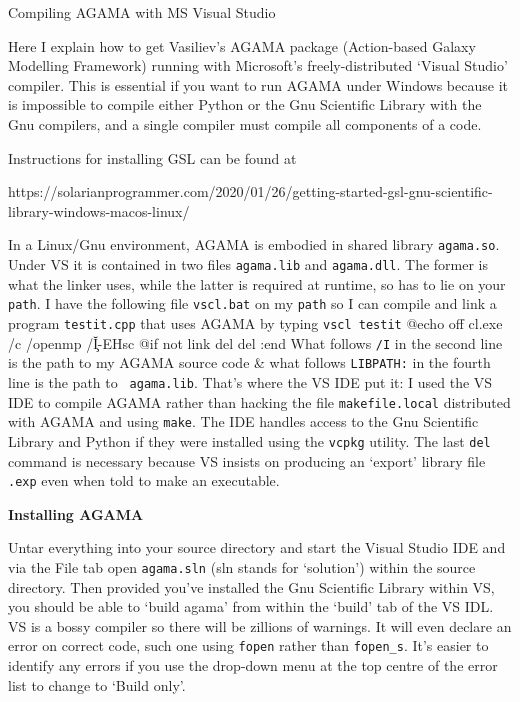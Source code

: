  \reportformat
\centerline{\titlefont Compiling AGAMA with MS Visual Studio}

\bigskip\noindent
Here I explain how to get Vasiliev's  AGAMA package (Action-based  Galaxy
Modelling Framework) running with Microsoft's freely-distributed `Visual Studio'
compiler. This is essential if you want to run AGAMA under
Windows because it is impossible to compile either Python or the Gnu
Scientific Library with the Gnu compilers, and a single compiler must compile all
components of a code.

Instructions for installing GSL can be found at

\noindent https://solarianprogrammer.com/2020/01/26/getting-started-gsl-gnu-scientific-library-windows-macos-linux/

In a Linux/Gnu environment, AGAMA is embodied in shared library {\tt agama.so}. Under
VS it is contained in two files {\tt agama.lib} and {\tt agama.dll}. The former is
what the linker uses, while the latter is required at runtime, so has to lie
on your {\tt path}. I have the following file {\tt vscl.bat} on my {\tt path}
so I can compile and link a program {\tt testit.cpp} that uses AGAMA by
typing {\tt vscl testit}
\begintt
@echo off
cl.exe /c /openmp /I\u\c\agama\agama -EHsc %
@if not %
link %
del %
del %
:end
\endtt
 What follows {\tt /I} in the second line is the path to my AGAMA source code
\& what follows {\tt LIBPATH:} in the fourth line is the path to {\tt
agama.lib}. That's where the VS IDE put it: I used the VS IDE to compile
AGAMA rather than hacking the file {\tt makefile.local} distributed with
AGAMA and using {\tt make}. The IDE handles access to the Gnu Scientific
Library and Python if they were installed using the {\tt vcpkg} utility.  The
last {\tt del} command is necessary because VS insists on producing an
`export' library file {\tt.exp} even when told to make an executable. 

\bigskip\centerline{\bf Installing AGAMA}

\noindent Untar everything into your source directory and start the Visual
Studio IDE and via the  File tab  open {\tt agama.sln} (sln stands for `solution') within the
source directory. Then provided you've installed the Gnu Scientific Library
within VS, you should be able to `build agama' from within the `build' tab of
the VS IDL. VS is a bossy compiler so there will be zillions of warnings. It
will even declare an error on correct code, such one using {\tt fopen} rather
than {\tt fopen\_s}.  It's easier to identify any errors if you use the
drop-down menu at the top centre of the error list to change to `Build only'.


